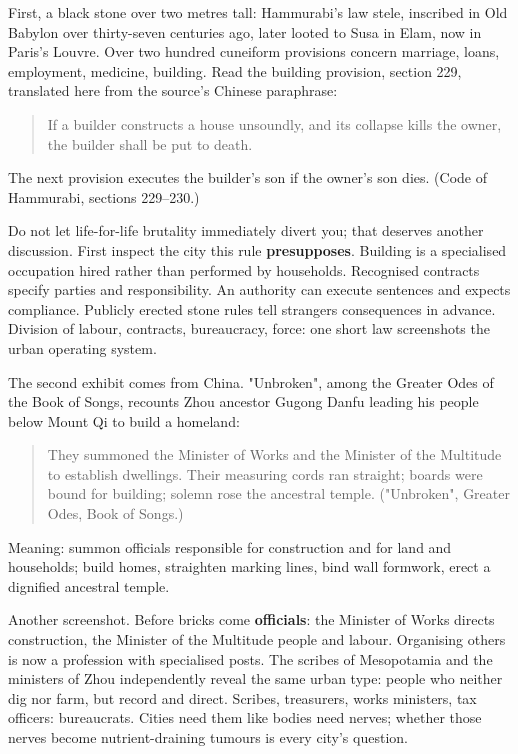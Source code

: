 First, a black stone over two metres tall: Hammurabi's law stele, inscribed in Old Babylon over thirty-seven centuries ago, later looted to Susa in Elam, now in Paris's Louvre. Over two hundred cuneiform provisions concern marriage, loans, employment, medicine, building. Read the building provision, section 229, translated here from the source's Chinese paraphrase:

\begin{quote}
If a builder constructs a house unsoundly, and its collapse kills the owner, the builder shall be put to death.
\end{quote}
The next provision executes the builder's son if the owner's son dies. (Code of Hammurabi, sections 229--230.)

Do not let life-for-life brutality immediately divert you; that deserves another discussion. First inspect the city this rule \textbf{presupposes}. Building is a specialised occupation hired rather than performed by households. Recognised contracts specify parties and responsibility. An authority can execute sentences and expects compliance. Publicly erected stone rules tell strangers consequences in advance. Division of labour, contracts, bureaucracy, force: one short law screenshots the urban operating system.

The second exhibit comes from China. "Unbroken", among the Greater Odes of the Book of Songs, recounts Zhou ancestor Gugong Danfu leading his people below Mount Qi to build a homeland:

\begin{quote}
They summoned the Minister of Works and the Minister of the Multitude to establish dwellings. Their measuring cords ran straight; boards were bound for building; solemn rose the ancestral temple. ("Unbroken", Greater Odes, Book of Songs.)
\end{quote}
Meaning: summon officials responsible for construction and for land and households; build homes, straighten marking lines, bind wall formwork, erect a dignified ancestral temple.

Another screenshot. Before bricks come \textbf{officials}: the Minister of Works directs construction, the Minister of the Multitude people and labour. Organising others is now a profession with specialised posts. The scribes of Mesopotamia and the ministers of Zhou independently reveal the same urban type: people who neither dig nor farm, but record and direct. Scribes, treasurers, works ministers, tax officers: bureaucrats. Cities need them like bodies need nerves; whether those nerves become nutrient-draining tumours is every city's question.

